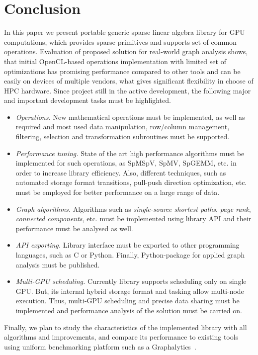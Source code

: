 \section{Conclusion}

In this paper we present portable generic sparse linear algebra library for GPU computations, which provides sparse primitives and supports set of common operations. Evaluation of proposed solution for real-world graph analysis shows, that initial OpenCL-based operations implementation with limited set of optimizations has promising performance compared to other tools and can be easily on devices of multiple vendors, what gives significant flexibility in choose of HPC hardware. Since project still in the active development, the following major and important development tasks must be highlighted.

\begin{itemize}
    \item \textit{Operations.} New mathematical operations must be implemented, as well as required and most used data manipulation, row/column management, filtering, selection and transformation subroutines must be supported.
    
    \item \textit{Performance tuning.} State of the art high performance algorithms must be implemented for such operations, as SpMSpV, SpMV, SpGEMM, etc. in order to increase library efficiency. Also, different techniques, such as automated storage format transitions, pull-push direction optimization, etc. must be employed for better performance on a large range of data.
    
    \item \textit{Graph algorithms.} Algorithms such as \textit{single-source shortest paths}, \textit{page rank}, \textit{connected components}, etc. must be implemented using library API and their performance must be analysed as well. 
    
    \item \textit{API exporting.} Library interface must be exported to other programming languages, such as C or Python. Finally, Python-package for applied graph analysis must be published.
    
    \item \textit{Multi-GPU scheduling.} Currently library supports scheduling only on single GPU. But, its internal hybrid storage format and tasking allow multi-node execution. Thus, multi-GPU scheduling and precise data sharing must be implemented and performance analysis of the solution must be carried on.
\end{itemize}

Finally, we plan to study the characteristics of the implemented library with all algorithms and improvements, and compare its performance to existing tools using uniform benchmarking platform such as a Graphalytics~\cite{Graphalytics:iosup2021ldbc}.